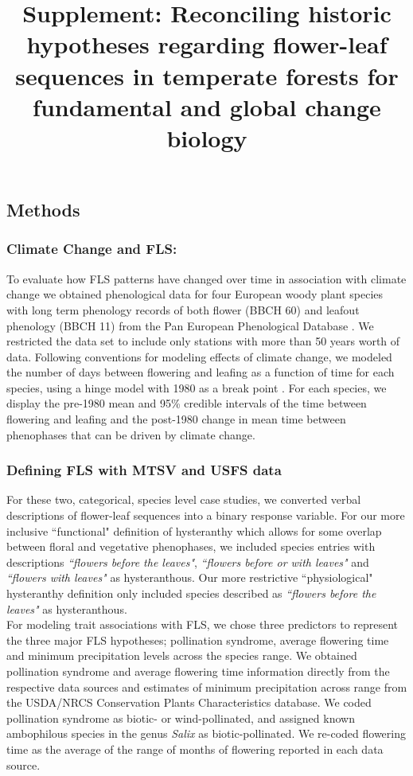 \documentclass{article}\usepackage[]{graphicx}\usepackage[]{color}
\title{Supplement: Reconciling historic hypotheses regarding flower-leaf sequences in temperate forests for fundamental and global change biology}
\begin{document}
\maketitle

\subsection*{Methods}
\subsubsection*{Climate Change and FLS:}
To evaluate how FLS patterns have changed over time in association with climate change we obtained phenological data for four European woody plant species with long term phenology records of both flower (BBCH 60) and leafout phenology (BBCH 11) from the Pan European Phenological Database \citep{PEP725}. We restricted the data set to include only stations with more than 50 years worth of data. Following conventions for modeling effects of climate change, we modeled the number of days between flowering and leafing as a function of time for each species, using a hinge model with 1980 as a break point \citep{Kharouba2018,IPCC2013}. For each species, we display the pre-1980 mean and 95\% credible intervals of the time between flowering and leafing and the post-1980 change in mean time between phenophases that can be driven by climate change.

\subsubsection*{Defining FLS with MTSV and USFS data}
For these two, categorical, species level case studies, we converted verbal descriptions of flower-leaf sequences into a binary response variable. For our more inclusive ``functional" definition of hysteranthy which allows for some overlap between floral and vegetative phenophases, we included species entries with descriptions \textit{``flowers before the leaves"}, \textit{``flowers before or with leaves"} and \textit{``flowers with leaves"} as hysteranthous. Our more restrictive ``physiological" hysteranthy definition only included species described as \textit{``flowers before the leaves"} as hysteranthous.\\

\noindent For modeling trait associations with FLS, we chose three predictors to represent the three major FLS hypotheses; pollination syndrome, average flowering time and minimum precipitation levels across the species range. We obtained pollination syndrome and average flowering time information directly from the respective data sources and estimates of minimum precipitation across range from the USDA/NRCS Conservation Plants Characteristics database. We coded pollination syndrome as biotic- or wind-pollinated, and assigned known ambophilous species in the genus \textit{Salix} as biotic-pollinated. We re-coded flowering time as the average of the range of months of flowering reported in each data source.\\
\end{document}
